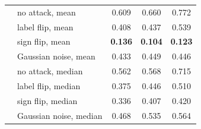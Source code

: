 \begin{table}[t]
\begin{tabular}{lccc}
~~no attack, mean & 0.609 & 0.660 & 0.772\\
~~label flip, mean & 0.408 & 0.437 & 0.539\\
~~sign flip, mean & \textbf{0.136} & \textbf{0.104} & \textbf{0.123}\\
~~Gaussian noise, mean & 0.433 & 0.449 & 0.446\\
~~no attack, median & 0.562 & 0.568 & 0.715\\
~~label flip, median & 0.375 & 0.446 & 0.510\\
~~sign flip, median & 0.336 & 0.407 & 0.420\\
~~Gaussian noise, median & 0.468 & 0.535 & 0.564\\
\bottomrule
\end{tabular}
\end{table}
